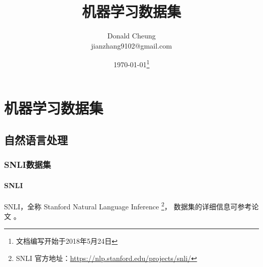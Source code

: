 \ifx\projectsnotes\undefined
    \providecommand{\notesroot}{../..}
    \providecommand{\datasetsroot}{.}

    \title{机器学习数据集}
    \author{Donald Cheung\\jianzhang9102@gmail.com}
    \date{\today\footnote{文档编写开始于2018年5月24日}}

    
\else
    \providecommand{\datasetsroot}{\projectsroot/datasets}
\fi

\chapter{机器学习数据集}

\section{自然语言处理}

\subsection{SNLI数据集}

\subsubsection{SNLI}
SNLI，全称 Stanford Natural Language Inference
\footnote{SNLI 官方地址：\url{https://nlp.stanford.edu/projects/snli/}}，
数据集的详细信息可参考论文 \cite{Bowman:2015aa}。

